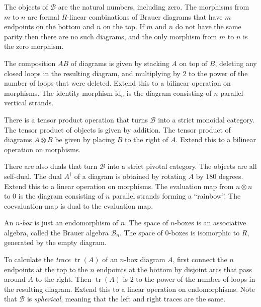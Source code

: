 \documentclass{article}
\DeclareMathOperator{\tr}{tr}
\newcommand{\id}{\mathrm{id}}
\begin{document}
The objects of $\mathcal{B}$ are the natural numbers, including zero.
The morphisms from $m$ to $n$ are formal $R$-linear combinations of Brauer
diagrams that have $m$ endpoints on the bottom and $n$ on the top.  If $m$
and $n$ do not have the same parity then there are no such diagrams,
and the only morphism from $m$ to $n$ is the zero morphism.

The composition $AB$ of diagrams is given by stacking $A$ on top of $B$,
deleting any closed loops in the resulting diagram, and multiplying by $2$
to the power of the number of loops that were deleted.  Extend this to a
bilinear operation on morphisms.  The identity morphism $\id_n$ is the
diagram consisting of $n$ parallel vertical strands.

There is a tensor product operation that turns $\mathcal{B}$ into a strict
monoidal category.  The tensor product of objects is given by addition.
The tensor product of diagrams $A\otimes B$ be given by placing $B$
to the right of $A$.  Extend this to a bilinear operation on morphisms.

There are also duals that turn $\mathcal{B}$ into a strict pivotal
category.  The objects are all self-dual.  The dual $A^\dagger$ of a
diagram is obtained by rotating $A$ by $180$ degrees.  Extend this to
a linear operation on morphisms.  The evaluation map from
$n \otimes n$ to $0$ is the diagram consisting of $n$ parallel strands
forming a ``rainbow''.  The coevaluation map is dual to the evaluation
map.

An \emph{$n$-box} is just an endomorphism of $n$.  The space of $n$-boxes
is an associative algebra, called the Brauer algebra $\mathcal{B}_n$.
The space of $0$-boxes is isomorphic to $R$, generated by the empty
diagram.

To calculate the \emph{trace} $\tr(A)$ of an $n$-box diagram $A$, first
connect the $n$ endpoints at the top to the $n$ endpoints at the bottom
by disjoint arcs that pass around $A$ to the right.  Then $\tr(A)$ is $2$
to the power of the number of loops in the resulting diagram.  Extend
this to a linear operation on endomorphisms.  Note that $\mathcal{B}$
is \emph{spherical}, meaning that the left and right traces are the same.
\end{document}
